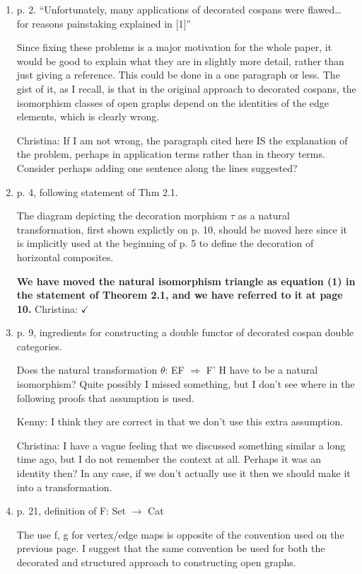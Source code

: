 \documentclass[reqno]{amsart}
\def\chris{\color{purple} Christina: }
\def\kenny{\color{blue} Kenny: }
\begin{document}
\begin{enumerate}
{\chris Third review starts here}
\item p. 2. “Unfortunately, many applications of decorated cospans were flawed… for reasons painstaking explained in [1]”

Since fixing these problems is a major motivation for the whole paper, it would be good to explain what they are in slightly more detail, rather than 
just giving a reference. This could be done in a one paragraph or less. The gist of it, as I recall, is that in the original approach to decorated 
cospans, the isomorphism classes of open graphs depend on the identities of the edge elements, which is clearly wrong.

{\chris If I am not wrong, the paragraph cited here IS the explanation of the problem, perhaps in application terms rather than in theory terms. 
Consider perhaps adding one sentence along the lines suggested?}

\item p. 4, following statement of Thm 2.1.

The diagram depicting the decoration morphism $\tau$ as a natural transformation, first shown explictly on p. 10, should be moved here since it is 
implicitly used at the beginning of p. 5 to define the decoration of horizontal composites.

{\bf We have moved the natural isomorphism triangle as equation (1) in the statement of Theorem 2.1, and we have referred to it at page 10.} {\chris 
$\checkmark$}

\item p. 9, ingredients for constructing a double functor of decorated cospan double categories.

Does the natural transformation $\theta$: EF $\Rightarrow$ F’ H have to be a natural isomorphism? Quite possibly I missed something, but I don’t see 
where in 
the following proofs that assumption is used.

{\kenny I think they are correct in that we don't use this extra assumption.}

{\chris I have a vague feeling that we discussed something similar a long time ago, but I do not remember the context at all. Perhaps it was an 
identity then? In any case, if we don't actually use it then we should make it into a transformation.}

\item p. 21, definition of F: Set $\to$ Cat

The use f, g for vertex/edge maps is opposite of the convention used on the previous page. I suggest that the same convention be used for both the 
decorated and structured approach to constructing open graphs.


\end{enumerate}
\end{document}
